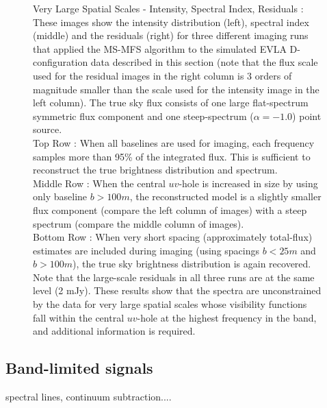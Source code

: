 \documentclass[structabstract]{stylefiles/aa}
\begin{document}
\begin{figure}[h!]
\begin{center}
\end{center}
\caption[Very Large Spatial Scales : Intensity, Spectral Index, Residuals ]
{\small Very Large Spatial Scales - Intensity, Spectral Index, Residuals : 
These images show the intensity distribution (left), spectral index
(middle) and the residuals (right) for three different imaging runs that 
	applied the MS-MFS 
algorithm to the simulated EVLA D-configuration data described in this section
(note that the flux scale used for the residual images in the 
 right column is 3 orders of
 magnitude smaller than the scale used for the intensity image in the left column).
The true sky flux consists of one large flat-spectrum symmetric flux 
component and one steep-spectrum ($\alpha=-1.0$) point source. \\
Top Row : When all baselines are used for imaging,
each frequency samples more than 95\% of the integrated flux. This is
sufficient to reconstruct the true brightness distribution and spectrum.\\
Middle Row : When the central $uv$-hole is increased in size by using
only baseline $b>100m$, the reconstructed model is a slightly smaller flux
component (compare the left column of images) 
with a steep spectrum (compare the middle column of images).\\
Bottom Row : When very short spacing (approximately total-flux) estimates are
included during imaging (using spacings $b<25m$ and $b>100m$), the true sky
brightness distribution is again recovered.
Note that the large-scale residuals in
all three runs are at the same level (2 mJy).
These results show that the spectra are unconstrained by the data 
for very large spatial scales whose visibility functions
fall within the central $uv$-hole at the highest frequency in the band,
and additional information is required. 
}
\label{Fig:zero_images}
\end{figure}


\subsection{Band-limited signals}
spectral lines, continuum subtraction....
\end{document}
